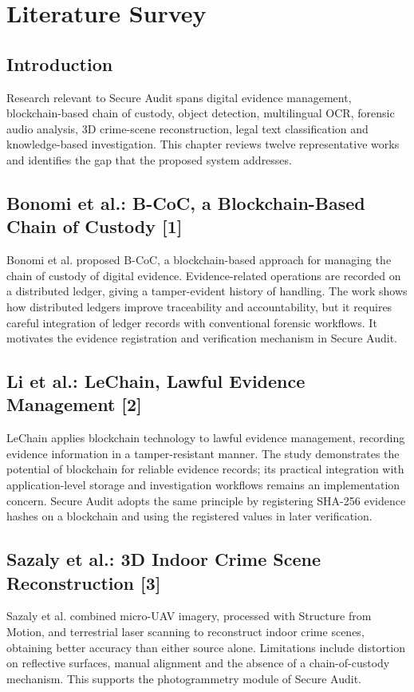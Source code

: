 \documentclass[12pt,a4paper,oneside]{report}
\begin{document}
\chapter{Literature Survey}
\section{Introduction}
Research relevant to Secure Audit spans digital evidence management, blockchain-based chain of custody, object detection, multilingual OCR, forensic audio analysis, 3D crime-scene reconstruction, legal text classification and knowledge-based investigation. This chapter reviews twelve representative works and identifies the gap that the proposed system addresses.

\section{Bonomi et al.: B-CoC, a Blockchain-Based Chain of Custody [1]}
Bonomi et al. proposed B-CoC, a blockchain-based approach for managing the chain of custody of digital evidence. Evidence-related operations are recorded on a distributed ledger, giving a tamper-evident history of handling. The work shows how distributed ledgers improve traceability and accountability, but it requires careful integration of ledger records with conventional forensic workflows. It motivates the evidence registration and verification mechanism in Secure Audit.

\section{Li et al.: LeChain, Lawful Evidence Management [2]}
LeChain applies blockchain technology to lawful evidence management, recording evidence information in a tamper-resistant manner. The study demonstrates the potential of blockchain for reliable evidence records; its practical integration with application-level storage and investigation workflows remains an implementation concern. Secure Audit adopts the same principle by registering SHA-256 evidence hashes on a blockchain and using the registered values in later verification.

\section{Sazaly et al.: 3D Indoor Crime Scene Reconstruction [3]}
Sazaly et al. combined micro-UAV imagery, processed with Structure from Motion, and terrestrial laser scanning to reconstruct indoor crime scenes, obtaining better accuracy than either source alone. Limitations include distortion on reflective surfaces, manual alignment and the absence of a chain-of-custody mechanism. This supports the photogrammetry module of Secure Audit.
\end{document}
